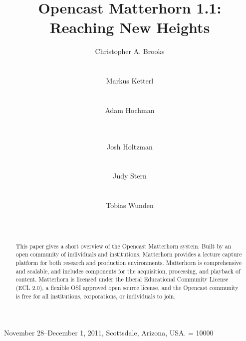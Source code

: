 \documentclass{sig-alternate}
\begin{document}
 {November 28--December 1, 2011, Scottsdale, Arizona, USA.} 
\widowpenalty = 10000
\title{Opencast Matterhorn 1.1: Reaching New Heights}

\author{
%
\alignauthor
		Christopher A. Brooks \\
       \\
       \\
%
\alignauthor
		Markus Ketterl \titlenote{}\\
       \\
       \\
%
\alignauthor
		Adam Hochman\\
       \\
       \\
\and
%
\alignauthor
		Josh Holtzman\\
       \\
       \\
%
\alignauthor
		Judy Stern\\
       \\
       \\
%
\alignauthor
		Tobias Wunden\\
       \\
       \\
}


\maketitle
\begin{abstract}
This paper gives a short overview of the Opencast Matterhorn system.  Built by an open community of individuals and institutions, Matterhorn provides a lecture capture platform for both research and production environments.  Matterhorn is comprehensive and scalable, and includes components for the acquisition, processing, and playback of content.  Matterhorn is licensed under the liberal Educational Community License (ECL 2.0), a flexible OSI approved open source license, and the Opencast community is free for all institutions, corporations, or individuals to join.
\end{abstract}
\end{document}
